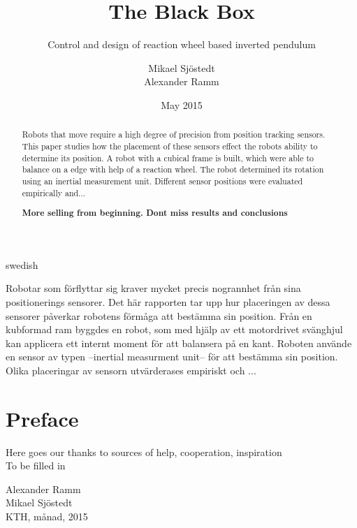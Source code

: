 \documentclass[a4paper,11pt]{kth-mag}
\title{The Black Box}
\subtitle{Control and design of reaction wheel based inverted pendulum}
\author{Mikael Sjöstedt \\ Alexander Ramm}
\date{May 2015}
\begin{document}

\clearpage

\frontmatter
\pagestyle{plain}
{}
\maketitle
{}
\begin{abstract}
Robots that move require a high degree of precision from position tracking sensors. This paper studies how the 
placement of these sensors effect the robots ability to determine its position. A robot with a cubical frame is
built, which were able to balance on a edge with help of a reaction wheel. The robot determined its rotation using an inertial measurement unit. Different sensor positions were evaluated empirically and...

\textbf{More selling from beginning. Dont miss results and conclusions}
 
\end{abstract}
\cleardoublepage
\begin{foreignabstract}{swedish}
Robotar som förflyttar sig kraver mycket precis nogrannhet från sina positionerings sensorer. Det här rapporten tar
upp hur placeringen av dessa sensorer påverkar robotens förmåga att bestämma sin position. Från en kubformad ram 
byggdes en robot, som med hjälp av ett motordrivet svänghjul kan applicera ett internt moment för att balansera på en kant. Roboten använde en sensor av typen --inertial measurment unit-- för att bestämma sin position. Olika placeringar av sensorn utvärderases empiriskt och ...
\\


\end{foreignabstract}
\clearpage
\chapter*{Preface}
Here goes our thanks to sources of  help, cooperation, inspiration \\ To be filled in \\
\begin{flushright}Alexander Ramm \\Mikael Sjöstedt \\ KTH, månad, 2015 \end{flushright}
\end{document}
